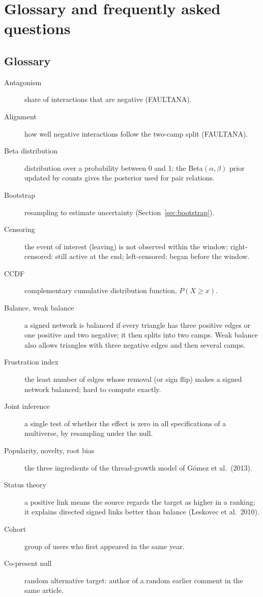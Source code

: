 \chapter{Glossary and frequently asked questions}\label{app:glossary}

\section*{Glossary}
\begin{description}
  \item[Antagonism] share of interactions that are negative (FAULTANA).
  \item[Alignment] how well negative interactions follow the two-camp split (FAULTANA).
  \item[Beta distribution] distribution over a probability between 0 and 1; the Beta$(\alpha,\beta)$ prior updated by counts gives the posterior used for pair relations.
  \item[Bootstrap] resampling to estimate uncertainty (Section~\ref{sec:bootstrap}).
  \item[Censoring] the event of interest (leaving) is not observed within the window; right-censored: still active at the end; left-censored: began before the window.
  \item[CCDF] complementary cumulative distribution function, $P(X\ge x)$.
  \item[Balance, weak balance] a signed network is balanced if every triangle has three positive edges or one positive and two negative; it then splits into two camps. Weak balance also allows triangles with three negative edges and then several camps.
  \item[Frustration index] the least number of edges whose removal (or sign flip) makes a signed network balanced; hard to compute exactly.
  \item[Joint inference] a single test of whether the effect is zero in all specifications of a multiverse, by resampling under the null.
  \item[Popularity, novelty, root bias] the three ingredients of the thread-growth model of G\'omez et al.\ (2013).
  \item[Status theory] a positive link means the source regards the target as higher in a ranking; it explains directed signed links better than balance (Leskovec et al.\ 2010).
  \item[Cohort] group of users who first appeared in the same year.
  \item[Co-present null] random alternative target: author of a random earlier comment in the same article.

\end{description}
